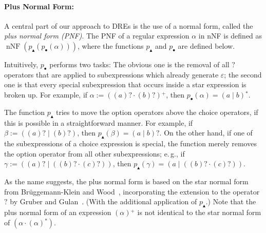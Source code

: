 \documentclass[a4paper,11pt, svgnames,titlepage]{article}
\newcommand{\rxp}{{^\mathtt{+}}}
\newcommand{\rxs}{{^\mathtt{*}}}
\newcommand{\rxo}{\mathtt{?}}
\newcommand{\rxc}{\cdot}
\DeclareMathOperator{\ror}{\mathtt{|}}
\newcommand{\emptyword}{\varepsilon}
\newcommand{\df}{:=}
\newcommand{\wpnffun}{p_{\bullet}}
\newcommand{\pnfupfun}{p_{\blacktriangle}}
\newcommand{\wpnf}[1]{\wpnffun{\left(#1\right)}}
\newcommand{\pnfup}[1]{\pnfupfun{\left(#1\right)}}
\DeclareMathOperator{\nnf}{nNF}
\begin{document}
\paragraph{Plus Normal Form:} A central part of our approach to DREs is the use of a normal form, called the \emph{plus normal form (PNF)}. The PNF of a regular expression $\alpha$ in nNF is defined as $\nnf(\pnfup{\wpnf{\alpha}})$, where the functions $\pnfupfun$ and $\wpnffun$ are defined below. 

Intuitively, $\wpnffun$ performs two tasks: The obvious one is the removal of all $\rxo$ operators that are applied to subexpressions which already generate $\emptyword$; the second one is that every special subexpression that occurs inside a star expression is broken up. For example, if $\alpha\df ((a)\rxo \rxc (b)\rxo)\rxp$, then $\wpnf{\alpha}= (a\ror b)\rxs$.

The function $\pnfupfun$ tries to move the option operators above the choice operators, if this is possible in a straightforward manner. For example, if $\beta\df ((a)\rxo \ror (b)\rxo)$, then $\pnfup{\beta}=(a\ror b)\rxo$. On the other hand, if one of the subexpressions of a choice expression is special, the function merely removes the option operator from all other subexpressions; e.\,g., if $\gamma\df ( (a)\rxo \ror ((b)\rxo\rxc (c)\rxo))$, then $\pnfup{\gamma}=(a \ror ((b)\rxo\rxc (c)\rxo) )$.

As the name suggests, the plus normal form is based on the star normal form from Brüggemann-Klein and Wood~\cite{bru:one}, incorporating the extension to the operator $\rxo$ by Gruber and Gulan~\cite{gru:sim}. (With the additional application of $\pnfupfun$.) Note that the plus normal form of an expression $(\alpha)\rxp$ is not identical to the star normal form of $(\alpha \rxc (\alpha)\rxs)$. 
\end{document}
